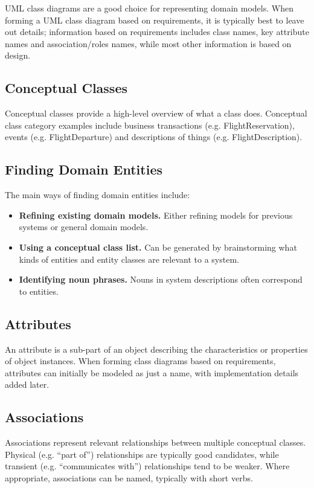 \documentclass[12pt,titlepage]{article}
\begin{document}
      UML class diagrams are a good choice for representing domain models. When forming a UML class diagram based on requirements, it is typically best to leave out details;
      information based on requirements includes class names, key attribute names and association/roles names, while most other information is based on design.

    \subsection{Conceptual Classes}
      Conceptual classes provide a high-level overview of what a class does. Conceptual class category examples include business transactions (e.g. FlightReservation), events
      (e.g. FlightDeparture) and descriptions of things (e.g. FlightDescription).

    \subsection{Finding Domain Entities}
      The main ways of finding domain entities include:
      \begin{itemize}
        \item \textbf{Refining existing domain models.} Either refining models for previous systems or general domain models.
        \item \textbf{Using a conceptual class list.} Can be generated by brainstorming what kinds of entities and entity classes are relevant to a system.
        \item \textbf{Identifying noun phrases.} Nouns in system descriptions often correspond to entities.
      \end{itemize}

    \subsection{Attributes}
      An attribute is a sub-part of an object describing the characteristics or properties of object instances. When forming class diagrams based on requirements, attributes can
      initially be modeled as just a name, with implementation details added later.

    \subsection{Associations}
      Associations represent relevant relationships between multiple conceptual classes. Physical (e.g. ``part of'') relationships are typically good candidates, while transient
      (e.g. ``communicates with'') relationships tend to be weaker. Where appropriate, associations can be named, typically with short verbs.
\end{document}
